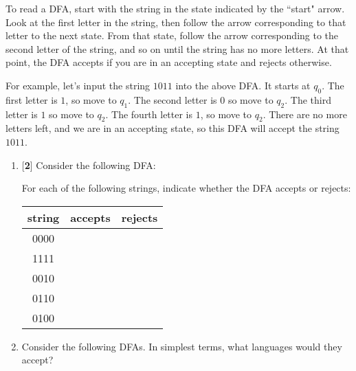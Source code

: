 \documentclass[11pt]{article}
\newcounter{enum}
\begin{document}
To read a DFA, start with the string in the state indicated by the ``start" arrow. Look at the first letter in the string, then follow the arrow corresponding to that letter to the next state. From that state, follow the arrow corresponding to the second letter of the string, and so on until the string has no more letters. At that point, the DFA accepts if you are in an accepting state and rejects otherwise.

For example, let's input the string $1011$ into the above DFA. It starts at $q_0$. The first letter is $1$, so move to $q_1$. The second letter is $0$ so move to $q_2$. The third letter is $1$ so move to $q_2$. The fourth letter is $1$, so move to $q_2$. There are no more letters left, and we are in an accepting state, so this DFA will accept the string $1011$.

\begin{enumerate}
\item {[}\textbf{2}{]} Consider the following DFA:

\begin{center}
\end{center}

For each of the following strings, indicate whether the DFA accepts or rejects:

\begin{center}
\begin{tabular}{c|c|c}
string & accepts & rejects \\
\hline
0000 &  & \\
\hline
1111 &  & \\
\hline
0010 &  & \\
\hline
0110 &  & \\
\hline
0100 &  & \\
\end{tabular}
\end{center}

\item Consider the following DFAs.  In simplest terms, what languages would they accept?


\end{enumerate}
\end{document}
